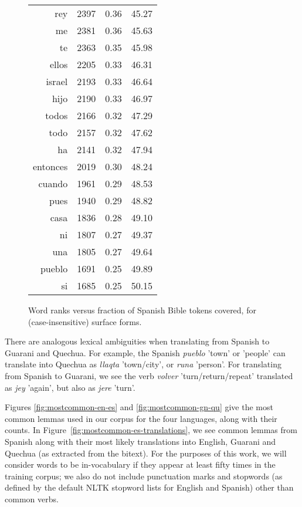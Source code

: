 \begin{figure*}
\begin{tiny}
\begin{centering}
\begin{tabular}{|r|c|c|c|}
rey & 2397 & 0.36 & 45.27 \\
me & 2381 & 0.36 & 45.63 \\
te & 2363 & 0.35 & 45.98 \\
ellos & 2205 & 0.33 & 46.31 \\
israel & 2193 & 0.33 & 46.64 \\
hijo & 2190 & 0.33 & 46.97 \\
todos & 2166 & 0.32 & 47.29 \\
todo & 2157 & 0.32 & 47.62 \\
ha & 2141 & 0.32 & 47.94 \\
entonces & 2019 & 0.30 & 48.24 \\
cuando & 1961 & 0.29 & 48.53 \\
pues & 1940 & 0.29 & 48.82 \\
casa & 1836 & 0.28 & 49.10 \\
ni & 1807 & 0.27 & 49.37 \\
una & 1805 & 0.27 & 49.64 \\
pueblo & 1691 & 0.25 & 49.89 \\
si & 1685 & 0.25 & 50.15 \\
\hline
\end{tabular}
\end{centering}
\end{tiny}

  \caption{Word ranks versus fraction of Spanish Bible tokens covered, for
  (case-insensitive) surface forms.}
  \label{fig:mostcommon-surface}
\end{figure*}

There are analogous lexical ambiguities when translating from Spanish to
Guarani and Quechua.
For example, the Spanish \emph{pueblo} 'town' or 'people' can translate into
Quechua as \emph{llaqta} 'town/city', or \emph{runa} 'person'.
For translating from Spanish to Guarani, we see the verb \emph{volver}
'turn/return/repeat' translated as \emph{jey} 'again', but also as \emph{jere}
'turn'.

Figures \ref{fig:mostcommon-en-es} and \ref{fig:mostcommon-gn-qu} give the most
common lemmas used in our corpus for the four languages, along with their
counts.
In Figure~\ref{fig:mostcommon-es-translations}, we see common lemmas from
Spanish along with their most likely translations into English, Guarani and
Quechua (as extracted from the bitext). For the purposes of this work, we will
consider words to be in-vocabulary if they appear at least fifty times in the
training corpus; we also do not include punctuation marks and stopwords (as
defined by the default NLTK stopword lists for English and Spanish) other than
common verbs.

